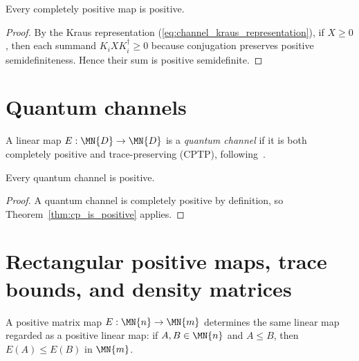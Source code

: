 \begin{theorem}\label{thm:cp_is_positive}
    \leanok
    Every completely positive map is positive.
\end{theorem}

\begin{proof}\leanok
    By the Kraus representation (\ref{eq:channel_kraus_representation}), if
    $X \ge 0$, then each summand $K_i X K_i^\dagger \ge 0$ because
    conjugation preserves positive semidefiniteness. Hence their sum is
    positive semidefinite.
\end{proof}

\section{Quantum channels}

\begin{definition}\label{def:channel}
    \leanok
    A linear map $E : \MN{D} \to \MN{D}$ is a \emph{quantum channel}
    if it is both completely positive and trace-preserving (CPTP),
    following~\cite{Wolf2012Quantum}.
\end{definition}

\begin{theorem}\label{thm:channel_positive}
    \leanok
    Every quantum channel is positive.
\end{theorem}

\begin{proof}\leanok{}
    A quantum channel is completely positive by definition, so
    Theorem~\ref{thm:cp_is_positive} applies.
\end{proof}

\section{Rectangular positive maps, trace bounds, and density matrices}

\begin{definition}
    \label{def:positive_map_is_positive_linear_map}
    \leanok
    A positive matrix map $E : \MN{n} \to \MN{m}$ determines the same
    linear map regarded as a positive linear map: if
    $A,B\in\MN{n}$ and $A \le B$, then $E(A) \le E(B)$ in $\MN{m}$.
\end{definition}

